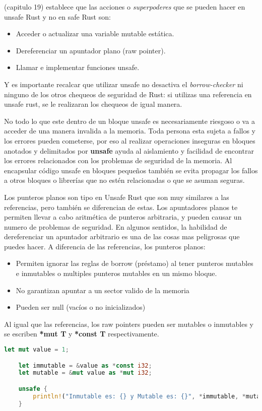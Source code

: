 \cite{rustbook} (capitulo 19) establece que las acciones o \textit{superpoderes} que se pueden hacer en unsafe Rust y no en safe Rust son:
\begin{itemize}
    \item Acceder o actualizar una variable mutable estática.
    \item Dereferenciar un apuntador plano (raw pointer).
    \item Llamar e implementar funciones unsafe.
\end{itemize}
Y es importante recalcar que utilizar unsafe no desactiva el \textit{borrow-checker} ni ninguno de los otros chequeos de seguridad de Rust: si utilizas una referencia en unsafe rust, se le realizaran los chequeos de igual manera.

No todo lo que este dentro de un bloque unsafe es necesariamente riesgoso o va a acceder de una manera invalida a la memoria. Toda persona esta sujeta a fallos y los errores pueden cometerse, por eso al realizar operaciones inseguras en bloques anotados y delimitados por \textbf{unsafe} ayuda al aislamiento y facilidad de encontrar los errores relacionados con los problemas de seguridad de la memoria. Al encapsular código unsafe en bloques pequeños también se evita propagar los fallos a otros bloques o librerías que no estén relacionadas o que se asuman seguras.

Los punteros planos son tipo en Unsafe Rust que son muy similares a las referencias, pero también se diferencian de estas. Los apuntadores planos te permiten llevar a cabo aritmética de punteros arbitraria, y pueden causar un numero de problemas de seguridad. En algunos sentidos, la habilidad de dereferenciar un apuntador arbitrario es una de las cosas mas peligrosas que puedes hacer.
A diferencia de las referencias, los punteros planos:
\begin{itemize}
    \item Permiten ignorar las reglas de borrow (préstamo) al tener punteros mutables e inmutables o multiples punteros mutables en un mismo bloque.
    \item No garantizan apuntar a un sector valido de la memoria
    \item Pueden ser null (vacíos o no inicializados)
\end{itemize}

Al igual que las referencias, los raw pointers pueden ser mutables o inmutables y se escriben \textbf{*mut T} y \textbf{*const T} respectivamente.
\begin{lstlisting}[language=Rust]
    let mut value = 1;

    let immutable = &value as *const i32;
    let mutable = &mut value as *mut i32;

    unsafe {
        println!("Inmutable es: {} y Mutable es: {}", *immutable, *mutable);
    }
\end{lstlisting}

